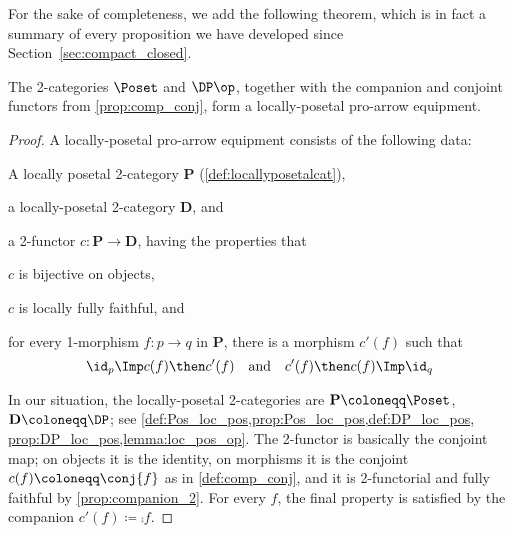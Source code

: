 For the sake of completeness, we add the following theorem, which is in fact a summary of every proposition we have developed since Section~\ref{sec:compact_closed}.

\begin{theorem}
The 2-categories $\Poset$ and $\DP\op$, together with the companion and conjoint functors from \cref{prop:comp_conj}, form a locally-posetal pro-arrow equipment.
\end{theorem}
\begin{proof}
A locally-posetal pro-arrow equipment consists of the following data:
\begin{compactitem}
	\item A locally posetal 2-category $\mathbf{P}$ (\cref{def:locallyposetalcat}),
	\item a locally-posetal 2-category $\mathbf{D}$, and
	\item a 2-functor $c\colon\mathbf{P}\to\mathbf{D}$, having the properties that
	\begin{compactitem}
		\item $c$ is bijective on objects,
		\item $c$ is locally fully faithful, and
		\item for every 1-morphism $f\colon p\to q$ in $\mathbf{P}$, there is a morphism $c'(f)$ such that
		\begin{equation}
		\id_p\Imp c(f)\then c'(f)\quad\text{and}\quad c'(f)\then c(f)\Imp\id_q
		\end{equation}
	\end{compactitem}
\end{compactitem}
In our situation, the locally-posetal 2-categories are $\mathbf{P}\coloneqq\Poset$, $\mathbf{D}\coloneqq\DP$; see \cref{def:Pos_loc_pos,prop:Pos_loc_pos,def:DP_loc_pos, prop:DP_loc_pos,lemma:loc_pos_op}. The 2-functor is basically the conjoint map; on objects it is the identity, on morphisms it is the conjoint $c(f)\coloneqq\conj{f}$ as in \cref{def:comp_conj}, and it is 2-functorial and fully faithful by \cref{prop:companion_2}. For every $f$, the final property is satisfied by the companion $c'(f)\coloneqq \comp{f}$.
\end{proof}



